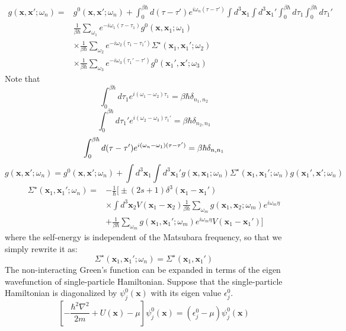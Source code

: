 \[
\begin{aligned}
g(\mathbf{x},\mathbf{x}';\omega_n)=&g^0(\mathbf{x},\mathbf{x}';\omega_n)+\int_0^{\beta\hbar} d(\tau-\tau') e^{i\omega_n(\tau-\tau')} \int d^3\mathbf{x}_1 \int d^3\mathbf{x}_1' \int_0^{\beta\hbar} d\tau_1 \int_0^{\beta\hbar} d\tau_1'\\
&\frac{1}{\beta\hbar}\sum_{\omega_1} e^{-i\omega_1(\tau-\tau_1)} g^0(\mathbf{x},\mathbf{x}_1;\omega_1)\\
&\times\frac{1}{\beta\hbar}\sum_{\omega_2} e^{-i\omega_2(\tau_1-\tau_1')} \Sigma^\star(\mathbf{x}_1,\mathbf{x}_1';\omega_2)\\
&\times\frac{1}{\beta\hbar}\sum_{\omega_3} e^{-i\omega_3(\tau_1'-\tau')} g^0(\mathbf{x}_1',\mathbf{x}';\omega_3)
\end{aligned}
\]
Note that
\[
\int_0^{\beta\hbar} d\tau_1 e^{i(\omega_1-\omega_2)\tau_1}=\beta\hbar\delta_{n_1,n_2}
\]
\[
\int_0^{\beta\hbar} d\tau_1' e^{i(\omega_2-\omega_3)\tau_1'}=\beta\hbar\delta_{n_2,n_3}
\]
\[
\int_0^{\beta\hbar} d(\tau-\tau') e^{i(\omega_n-\omega_1)(\tau-\tau')}=\beta\hbar\delta_{n,n_1}\\
\]
\[
g(\mathbf{x},\mathbf{x}';\omega_n)=g^0(\mathbf{x},\mathbf{x}';\omega_n)+\int d^3\mathbf{x}_1\int d^3\mathbf{x}_1' g(\mathbf{x},\mathbf{x}_1;\omega_n) \Sigma^\star(\mathbf{x}_1,\mathbf{x}_1';\omega_n) g(\mathbf{x}_1',\mathbf{x}';\omega_n)
\]
\begin{equation}\label{eq4.5.12}
\begin{aligned}
\Sigma^\star(\mathbf{x}_1,\mathbf{x}_1';\omega_n)=&-\frac{1}{\hbar}\Big [\pm(2s+1)\delta^3(\mathbf{x}_1-\mathbf{x}_1')\\
&\times\int d^3\mathbf{x}_2 V(\mathbf{x}_1-\mathbf{x}_2)\frac{1}{\beta\hbar} \sum_{\omega_m} g(\mathbf{x}_1,\mathbf{x}_2;\omega_m)e^{i\omega_m\eta}\\
&+\frac{1}{\beta\hbar}\sum_{\omega_m}g(\mathbf{x}_1,\mathbf{x}_1';\omega_m)e^{i\omega_m\eta}V(\mathbf{x}_1-\mathbf{x}_1')\Big ]
\end{aligned}
\end{equation}
where the self-energy is independent of the Matsubara frequency, so that we simply rewrite it as:
\[
\Sigma^\star(\mathbf{x}_1,\mathbf{x}_1';\omega_n)=\Sigma^\star(\mathbf{x}_1,\mathbf{x}_1')
\]
The non-interacting Green's function can be expanded in terms of the eigen wavefunction of single-particle Hamiltonian.
Suppose that the single-particle Hamiltonian is diagonalized by $\psi_j^0(\mathbf{x})$ with its eigen value $\epsilon_j^0$.
\begin{equation}
\left[-\frac{\hbar^2\nabla^2}{2m}+U(\mathbf{x})-\mu\right]\psi_j^0(\mathbf{x})=(\epsilon_j^0-\mu)\psi_j^0(\mathbf{x})
\end{equation}
